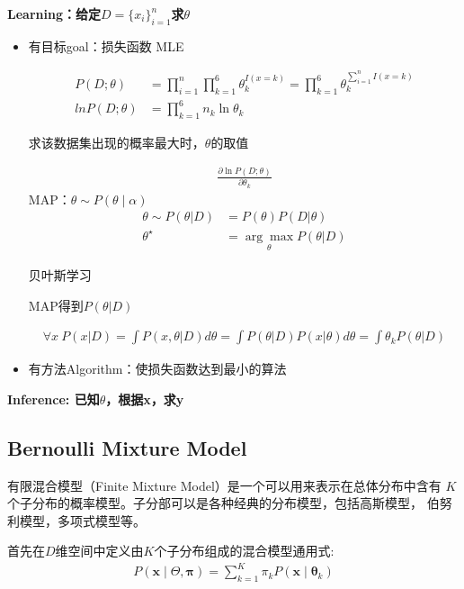 \documentclass[UTF8]{ctexart}
\numberwithin{equation}{section}
\begin{document}
\textbf{Learning：给定$D=\{x_i\}_{i=1}^{n}$求$\theta$}
\begin{itemize}
    \item 有目标goal：损失函数
        \subitem MLE  
        
        $$
        \begin{aligned}
        P(D;\theta)&=\prod^{n}_{i=1}\prod^{6}_{k=1}\theta_k^{I(x=k)}=\prod^{6}_{k=1}\theta_k^{\sum^{n}_{i=1}I(x=k)}  \\
        lnP(D;\theta)&=\prod^{6}_{k=1}n_k\ln\theta_k
        \end{aligned}
        $$

        \subsubitem 求该数据集出现的概率最大时，$\theta$的取值
			
        $$
        \begin{aligned}
            \frac{\partial \ln P(D;\theta)}{\partial \theta_k}
        \end{aligned}
        $$ 
        \subitem MAP：$\theta \sim P(\theta\mid\alpha)$
        $$
        \begin{aligned}
        \theta\sim P(\theta|D)&=P(\theta)P(D|\theta)\\
        \theta^{\star}&=\underset{\theta}{\arg \max}P(\theta|D)
        \end{aligned}
        $$

        \subitem 贝叶斯学习

           \subsubitem MAP得到$P(\theta|D)$
			
            $$
            \begin{aligned}
                \forall x ~P(x|D)=\int P(x,\theta|D)d\theta=\int P(\theta|D)P(x|\theta)d\theta=\int \theta_kP(\theta|D)
            \end{aligned}
            $$
            
    \item 有方法Algorithm：使损失函数达到最小的算法
\end{itemize}


\textbf{Inference: 已知$\theta$，根据x，求y}

\subsection{Bernoulli Mixture Model}
有限混合模型（Finite Mixture Model）是一个可以用来表示在总体分布中含有
$K$个子分布的概率模型。子分部可以是各种经典的分布模型，包括高斯模型，
伯努利模型，多项式模型等。

首先在$D$维空间中定义由$K$个子分布组成的混合模型通用式:
$$
\begin{aligned}
P(\boldsymbol{x} \mid \Theta, \boldsymbol{\pi})=\sum_{k=1}^{K} \pi_{k} P\left(\boldsymbol{x} \mid \boldsymbol{\theta}_{k}\right)
\end{aligned}
$$
\end{document}
